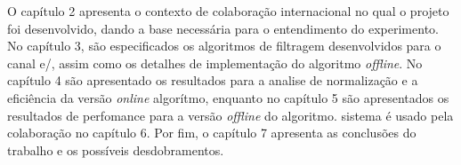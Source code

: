 O capítulo 2 apresenta o contexto de colaboração internacional no qual o projeto
foi desenvolvido, dando a base necessária para o entendimento do experimento. No
capítulo 3, são especificados os algoritmos de filtragem desenvolvidos para o
canal e/\gamma, assim como os detalhes de implementação do algoritmo
\emph{offline}. No capítulo 4 são apresentado os resultados para a analise de
normalização e a eficiência da versão {\it online} algorítmo, enquanto no
capítulo 5 são apresentados os resultados de perfomance para a versão {\it
offline} do algoritmo. 
sistema é usado pela colaboração no capítulo 6. Por fim, o capítulo 7 apresenta
as conclusões do trabalho e os possíveis desdobramentos.

